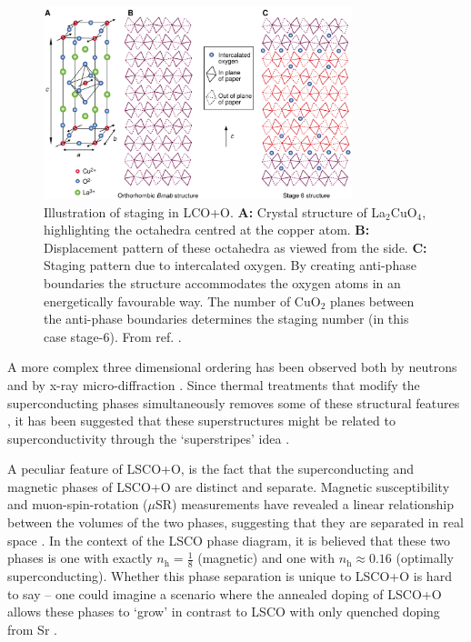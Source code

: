 \begin{figure}
    \centering
    \includegraphics[width=0.8\textwidth]{fig/intro/staging.png}
    \caption[staging]{Illustration of staging in LCO+O. \textbf{A:} Crystal structure of La$_2$CuO$_4$, highlighting the octahedra centred at the copper atom. \textbf{B:} Displacement pattern of these octahedra as viewed from the side. \textbf{C:} Staging pattern due to intercalated oxygen. By creating anti-phase boundaries the structure accommodates the oxygen atoms in an energetically favourable way. The number of CuO$_2$ planes between the anti-phase boundaries determines the staging number (in this case stage-6). From ref. \cite{Wells1997}.}
    \label{fig:staging}
\end{figure}

A more complex three dimensional ordering has been observed both by neutrons \cite{Ray2017, Lee2004} and by x-ray micro-diffraction \cite{Fratini2010, Poccia2012}. Since thermal treatments that modify the superconducting phases simultaneously removes some of these structural features \cite{Poccia2012}, it has been suggested that these superstructures might be related to superconductivity through the `superstripes' idea \cite{Bianconi2000}.

A peculiar feature of LSCO+O, is the fact that the superconducting and magnetic phases of LSCO+O are distinct and separate. Magnetic susceptibility and muon-spin-rotation ($\mu$SR) measurements have revealed a linear relationship between the volumes of the two phases, suggesting that they are separated in real space \cite{Mohottala2006,Udby2013}. In the context of the LSCO phase diagram, it is believed that these two phases is one with exactly $n_\text{h} = \frac{1}{8}$ (magnetic) and one with $n_\text{h} \approx 0.16$ (optimally superconducting). Whether this phase separation is unique to LSCO+O is hard to say -- one could imagine a scenario where the annealed doping of LSCO+O allows these phases to `grow' in contrast to LSCO with only quenched doping from Sr \cite{Udby2013}.

